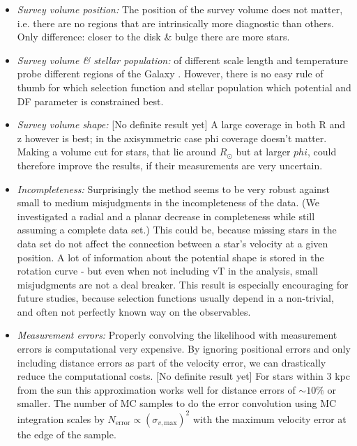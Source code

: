\begin{itemize}
\begin{itemize}
\item \emph{Survey volume position:} The position of the survey volume does not matter, i.e. there are no regions that are intrinsically more diagnostic than others. Only difference: closer to the disk \& bulge there are more stars.
\item \emph{Survey volume \& stellar population:} \MAPs of different scale length and temperature probe different regions of the Galaxy \citep{bov13}. However, there is no easy rule of thumb for which selection function and stellar population which potential and DF parameter is constrained best.
\item \emph{Survey volume shape:} [No definite result yet] A large coverage in both R and z however is best; in the axisymmetric case phi coverage doesn't matter. Making a volume cut for stars, that lie around $R_\odot$ but at larger $phi$, could therefore improve the results, if their measurements are very uncertain.

\item \emph{Incompleteness:} Surprisingly the method seems to be very robust against small to medium misjudgments in the incompleteness of the data. (We investigated a radial and a planar decrease in completeness while still assuming a complete data set.) This could be, because missing stars in the data set do not affect the connection between a star's velocity at a given position. A lot of information about the potential shape is stored in the rotation curve - but even when not including vT in the analysis, small misjudgments are not a deal breaker. This result is especially encouraging for future studies, because selection functions usually depend in a non-trivial, and often not perfectly known way on the observables.

\item \emph{Measurement errors:} Properly convolving the likelihood with measurement errors is computational very expensive. By ignoring positional errors and only including distance errors as part of the velocity error, we can drastically reduce the computational costs. [No definite result yet] For stars within 3 kpc from the sun this approximation works well for distance errors of $\sim 10\%$ or smaller. The number of MC samples to do the error convolution using MC integration scales by $N_\text{error} \propto (\sigma_{v,\text{max}})^2$ with the maximum velocity error at the edge of the sample.
\end{itemize}


\end{itemize}
